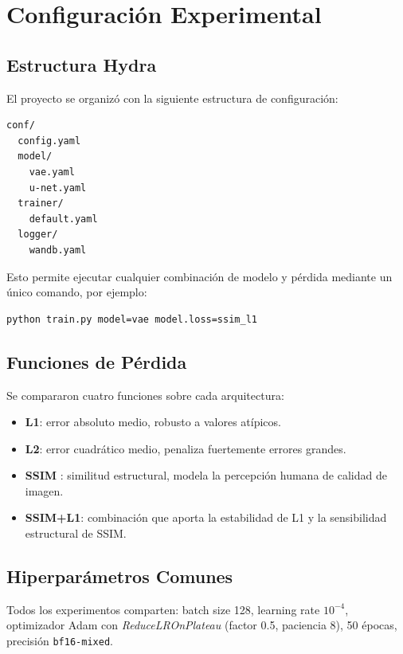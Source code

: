 \documentclass[conference]{IEEEtran}
\begin{document}
\section{Configuraci\'on Experimental}

\subsection{Estructura Hydra}

El proyecto se organiz\'o con la siguiente estructura de configuraci\'on:

\begin{verbatim}
conf/
  config.yaml
  model/
    vae.yaml
    u-net.yaml
  trainer/
    default.yaml
  logger/
    wandb.yaml
\end{verbatim}

Esto permite ejecutar cualquier combinaci\'on de modelo y p\'erdida
mediante un \'unico comando, por ejemplo:

\begin{verbatim}
python train.py model=vae model.loss=ssim_l1
\end{verbatim}

\subsection{Funciones de P\'erdida}

Se compararon cuatro funciones sobre cada arquitectura:

\begin{itemize}
  \item \textbf{L1}: error absoluto medio, robusto a valores at\'ipicos.
  \item \textbf{L2}: error cuadr\'atico medio, penaliza fuertemente
        errores grandes.
  \item \textbf{SSIM} \cite{ssim}: similitud estructural, modela la
        percepci\'on humana de calidad de imagen.
  \item \textbf{SSIM+L1}: combinaci\'on que aporta la estabilidad de L1
        y la sensibilidad estructural de SSIM.
\end{itemize}

\subsection{Hiperpar\'ametros Comunes}

Todos los experimentos comparten: batch size 128, learning rate
$10^{-4}$, optimizador Adam con \textit{ReduceLROnPlateau}
(factor 0.5, paciencia 8), 50 \'epocas, precisi\'on \texttt{bf16-mixed}.
\end{document}
